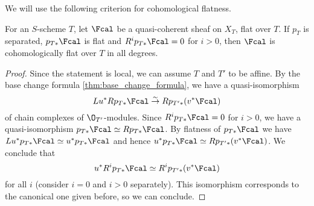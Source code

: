         We will use the following criterion for cohomological flatness.
        \begin{lemma}
            \label{lemma:wang_4_1_2}
            For an $S$-scheme $T$, let $\Fcal$ be a quasi-coherent sheaf on $X_T$, flat over $T$. If $p_T$ is separated, $p_{T*}\Fcal$ is flat and $R^ip_{T*}\Fcal = 0$ for $i > 0$, then $\Fcal$ is cohomologically flat over $T$ in all degrees. 
        \end{lemma}
        \begin{proof}
            Since the statement is local, we can assume $T$ and $T'$ to be affine.
            By the base change formula \cref{thm:base_change_formula}, we have a quasi-isomorphism \[Lu^*Rp_{T*}\Fcal \stackrel{\sim}{\to} Rp_{T'*}(v^*\Fcal) \] of chain complexes of $\O_{T'}$-modules. Since $R^ip_{T*}\Fcal = 0$ for $i > 0$, we have a quasi-isomorphism $p_{T*}\Fcal \simeq Rp_{T*}\Fcal$. By flatness of $p_{T*}\Fcal$ we have $Lu^*p_{T*}\Fcal \simeq u^*p_{T*}\Fcal$ and hence $u^*p_{T*}\Fcal \simeq Rp_{T'*}(v^*\Fcal)$. We conclude that \[u^*R^ip_{T*}\Fcal \simeq R^ip_{T'*}(v^*\Fcal) \] for all $i$ (consider $i=0$ and $i> 0$ separately). This isomorphism corresponds to the canonical one given before, so we can conclude.
        \end{proof}

